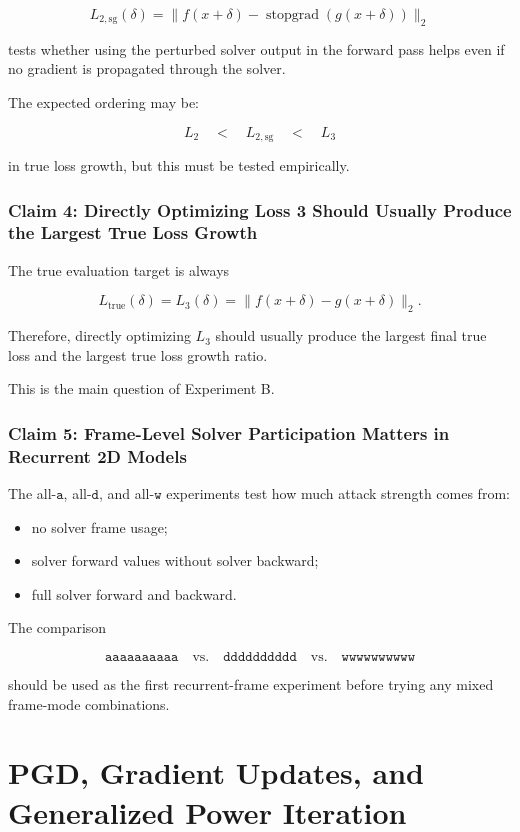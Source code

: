 \documentclass{article}
\begin{document}
\[
L_{2,\mathrm{sg}}(\delta)
=
\|f(x+\delta)-\operatorname{stopgrad}(g(x+\delta))\|_2
\]

tests whether using the perturbed solver output in the forward pass helps even if no gradient is propagated through the solver.

The expected ordering may be:

\[
L_2
\quad
<
\quad
L_{2,\mathrm{sg}}
\quad
<
\quad
L_3
\]

in true loss growth, but this must be tested empirically.

\subsubsection{Claim 4: Directly Optimizing Loss 3 Should Usually Produce the Largest True Loss Growth}

The true evaluation target is always

\[
L_{\mathrm{true}}(\delta)
=
L_3(\delta)
=
\|f(x+\delta)-g(x+\delta)\|_2.
\]

Therefore, directly optimizing \(L_3\) should usually produce the largest final true loss and the largest true loss growth ratio.

This is the main question of Experiment B.

\subsubsection{Claim 5: Frame-Level Solver Participation Matters in Recurrent 2D Models}

The all-\(\texttt{a}\), all-\(\texttt{d}\), and all-\(\texttt{w}\) experiments test how much attack strength comes from:

\begin{itemize}
    \item no solver frame usage;
    \item solver forward values without solver backward;
    \item full solver forward and backward.
\end{itemize}

The comparison

\[
\texttt{aaaaaaaaaa}
\quad
\text{vs.}
\quad
\texttt{dddddddddd}
\quad
\text{vs.}
\quad
\texttt{wwwwwwwwww}
\]

should be used as the first recurrent-frame experiment before trying any mixed frame-mode combinations.

\section{PGD, Gradient Updates, and Generalized Power Iteration}
\end{document}
